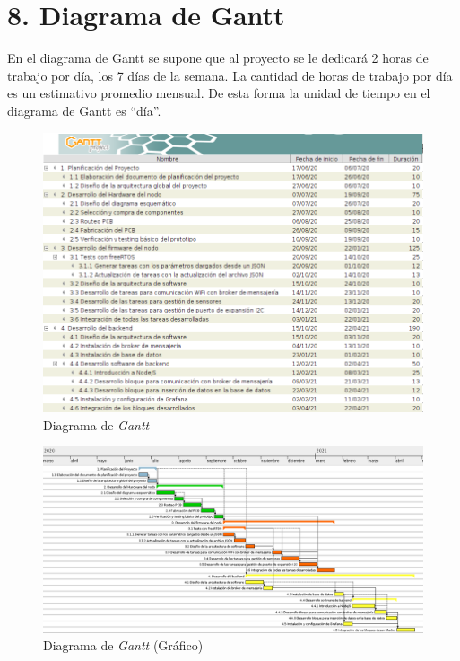 \documentclass[11pt]{charter}
\begin{document}
\clearpage

\section{8. Diagrama de Gantt}
\label{sec:gantt}
En el diagrama de Gantt se supone que al proyecto se le dedicará 2 horas de trabajo por día, los 7 días de la semana. La cantidad de horas de trabajo por día es un estimativo promedio mensual. De esta forma la unidad de tiempo en el diagrama de Gantt es ``día''.

\begin{figure}[htpb]
\centering 
\includegraphics[width=\textwidth]{./Figuras/TabGanttRedSensores.png}
\caption{Diagrama de \textit{Gantt}}
\label{fig:TabGantt}
\end{figure}

\begin{figure}[htb]
\centering 
\includegraphics[angle=90, height=.96\textheight]{./Figuras/GanttRedSensores2.png}
\caption{Diagrama de \textit{Gantt} (Gráfico)}
\label{fig:Gantt}
\end{figure}
\end{document}
